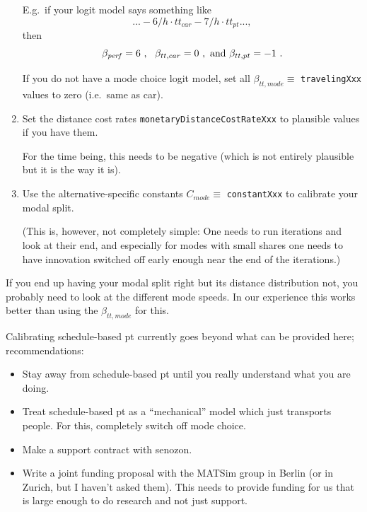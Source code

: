\begin{enumerate}
E.g.\ if your logit model says something like 
\[
... -6/h \cdot tt_{car} - 7/h \cdot tt_{pt} ... ,
\]
then 
\[
\beta_{\it perf} = 6 \ , \ \ \beta_{tt,car} = 0 \ , \hbox{ and } \beta_{tt,pt} = -1 \ .
\]

If you do not have a mode choice logit model, set all $\beta_{tt,mode} \equiv$ \verb$travelingXxx$ values to zero (i.e.\ same as car).

\item Set the distance cost rates \verb$monetaryDistanceCostRateXxx$ to plausible values if you have them.

For the time being, this needs to be negative (which is not entirely plausible but it is the way it is).

\item Use the alternative-specific constants $C_{mode} \equiv$ \verb$constantXxx$ to calibrate your modal split.

(This is, however, not completely simple: One needs to run iterations and look at their end, and especially for modes with small shares one needs to have innovation switched off early enough near the end of the iterations.)

\end{enumerate}

If you end up having your modal split right but its distance distribution not, you probably need to look at the different mode speeds.  In our experience this works better than using the $\beta_{tt,mode}$ for this.

Calibrating schedule-based pt currently goes beyond what can be provided here; recommendations:
\begin{itemize}

\item Stay away from schedule-based pt until you really understand what you are doing.

\item Treat schedule-based pt as a ``mechanical'' model which just transports people.  For this, completely switch off mode choice.

\item Make a support contract with senozon.

\item Write a joint funding proposal with the MATSim group in Berlin (or in Zurich, but I haven't asked them).  This needs to provide funding for us that is large enough to do research and not just support.

\end{itemize}

